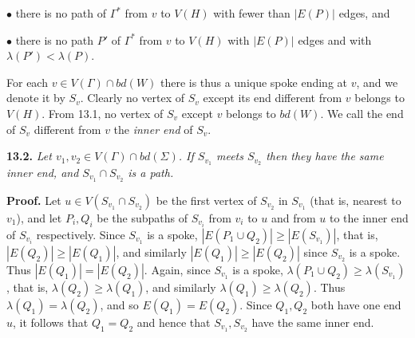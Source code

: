 \hspace*{12pt}$\bullet$ there is no path of $\Gamma^*$ from $v$ to $V(H)$ with fewer than $|E(P)|$ edges, and

\hspace*{12pt}$\bullet$ there is no path $P'$ of $\Gamma^*$ from $v$ to $V(H)$ with $|E(P)|$ edges and with $\lambda(P') < \lambda(P)$.

For each $v \in V(\Gamma) \cap bd(W)$ there is thus a unique spoke ending at $v$, and we denote it by $S_v$. Clearly no vertex of $S_v$ except its end different from $v$ belongs to $V(H)$. From 13.1, no vertex of $S_v$ except $v$ belongs to $bd(W)$. We call the end of $S_v$ different from $v$ the \textit{inner end} of $S_v$.

\textbf{13.2.} \textit{Let $v_1, v_2 \in V(\Gamma) \cap bd(\Sigma)$. If $S_{v_1}$ meets $S_{v_2}$ then they have the same inner end, and $S_{v_1} \cap S_{v_2}$ is a path.}

\textbf{Proof.} Let $u \in V(S_{v_1} \cap S_{v_2})$ be the first vertex of $S_{v_2}$ in $S_{v_1}$ (that is, nearest to $v_1$), and let $P_i, Q_i$ be the subpaths of $S_{v_i}$ from $v_i$ to $u$ and from $u$ to the inner end of $S_{v_i}$ respectively. Since $S_{v_1}$ is a spoke, $|E(P_1 \cup Q_2)| \ge |E(S_{v_1})|$, that is, $|E(Q_2)| \ge |E(Q_1)|$, and similarly $|E(Q_1)| \ge |E(Q_2)|$ since $S_{v_2}$ is a spoke. Thus $|E(Q_1)| = |E(Q_2)|$. Again, since $S_{v_1}$ is a spoke, $\lambda(P_1 \cup Q_2) \ge \lambda(S_{v_1})$, that is, $\lambda(Q_2) \ge \lambda(Q_1)$, and similarly $\lambda(Q_1) \ge \lambda(Q_2)$. Thus $\lambda(Q_1) = \lambda(Q_2)$, and so $E(Q_1) = E(Q_2)$. Since $Q_1, Q_2$ both have one end $u$, it follows that $Q_1 = Q_2$ and hence that $S_{v_1}, S_{v_2}$ have the same inner end.
